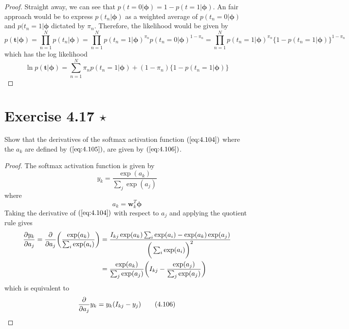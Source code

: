 \vspace{1em}

\begin{proof}
    Straight away, we can see that $p(t = 0 | \bm{\phi}) = 1 - p(t = 1 | \bm{\phi})$.
    An fair approach would be to express $p(t_n | \bm{\phi})$ as a weighted
    average of $p(t_n = 0 | \bm{\phi})$ and $p(t_n = 1 | \bm{\phi}$ dictated by $\pi_n$.
    Therefore, the likelihood would be given by 
    \[
        p(\mathbf{t} | \bm{\phi})
        = \prod_{n = 1}^N p(t_n | \bm{\phi})
        = \prod_{n = 1}^N p(t_n = 1 | \bm{\phi})^{\pi_n}
        p(t_n = 0 | \bm{\phi})^{1 - \pi_n}
        = \prod_{n = 1}^N p(t_n = 1 | \bm{\phi})^{\pi_n}
        \big\{1 - p(t_n = 1 | \bm{\phi})\big\}^{1 - \pi_n}
    \] 
    which has the log likelihood
    \[
        \ln p(\mathbf{t} | \bm{\phi}) 
        = \sum_{n=1}^{N} \pi_n p(t_n = 1 | \bm{\phi})
        + (1 - \pi_n)\big\{1 - p(t_n = 1 | \bm{\phi})\big\}
    \] 
\end{proof}

\section*{Exercise 4.17 $\star$}
Show that the derivatives of the softmax activation function
$(\ref{eq:4.104})$ where the $a_k$ are defined by $(\ref{eq:4.105})$, are
given by $(\ref{eq:4.106})$.

\vspace{1em}

\begin{proof}
    The softmax activation function is given by
    \begin{equation*}
        y_k = \frac{\exp(a_k)}{\sum_{j} \exp(a_j)}
        \tag{4.104}\label{eq:4.104}
    \end{equation*}
    where
    \begin{equation*}
        a_k = \mathbf{w}_k^T\bm{\phi}
        \tag{4.105}\label{eq:4.105}
    \end{equation*}
    Taking the derivative of $(\ref{eq:4.104})$ with respect to
    $a_j$ and applying the quotient rule gives
    \begin{align*}
        \pdv{y_k}{a_j} 
        = \pdv{a_j} \bigg(\frac{\exp(a_k)}{\sum_{i} \exp(a_i)}\bigg)
        &= \frac{I_{kj} \exp(a_k) \sum_{i} \exp(a_i) - \exp(a_k)\exp(a_j)} 
        {\bigg(\sum_{i} \exp(a_i)\bigg)^2} \\
        &= \frac{\exp(a_k)}{\sum_{j} \exp(a_j)}
        \bigg(I_{kj} - \frac{\exp(a_j)}{\sum_{j} \exp(a_j)}\bigg)
    \end{align*}
    which is equivalent to 
    \begin{equation*}
        \pdv{a_j} y_k = y_k(I_{kj} - y_j)
        \tag{4.106}\label{eq:4.106}
    \end{equation*}
\end{proof}

